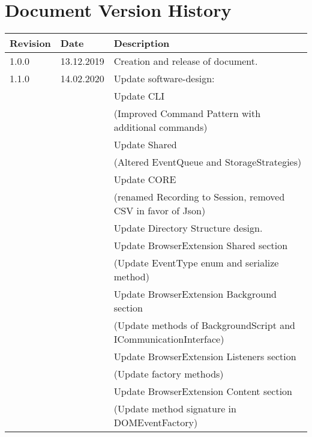 \chapter*{Document Version History}
\label{ch:versionhistory}
\begin{table}[h]
\begin{tabular}{lll}
\textbf{Revision} & \textbf{Date} & \textbf{Description}              \\
\hline
1.0.0             & 13.12.2019    & Creation and release of document. \\
\hline
1.1.0			  & 14.02.2020	  & Update software-design: \\
&& Update CLI \\
&& (Improved Command Pattern with additional commands) \\
&& Update Shared \\
&& (Altered EventQueue and StorageStrategies) \\
&& Update CORE \\
&& (renamed Recording to Session, removed CSV in favor of Json) \\
&& Update Directory Structure design. \\                                                          
&& Update BrowserExtension Shared section\\
&& (Update EventType enum and serialize method)\\
&& Update BrowserExtension Background section\\
&& (Update methods of BackgroundScript and ICommunicationInterface)\\
&& Update BrowserExtension Listeners section\\
&& (Update factory methods)\\
&& Update BrowserExtension Content section\\
&& (Update method signature in DOMEventFactory)\\
\end{tabular}
\end{table}